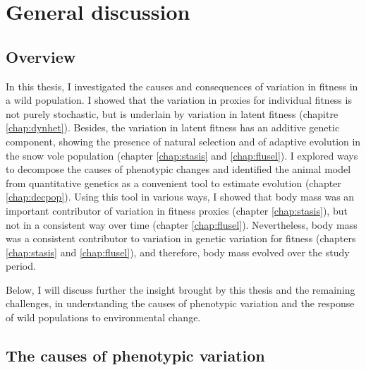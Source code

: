 
\chapter[\texorpdfstring{Chapter 6 \\ General discussion}{Chapter 6 General discussion}]{General discussion}
\label{chap:discu}

\section{Overview}
In this thesis, I investigated the causes and consequences of variation in fitness in a wild population. I showed that the variation in proxies for individual fitness is not purely stochastic, but is underlain by variation in latent fitness (chapitre \ref{chap:dynhet}). Besides, the variation in latent fitness has an additive genetic component, showing the presence of natural selection and of adaptive evolution in the snow vole population (chapter \ref{chap:stasis} and \ref{chap:flusel}).
I explored ways to decompose the causes of phenotypic changes and identified the animal model from quantitative genetics as a convenient tool to estimate evolution (chapter \ref{chap:decpop}).
Using this tool in various ways, I showed that body mass was an important contributor of variation in fitness proxies (chapter \ref{chap:stasis}), but not in a consistent way over time (chapter \ref{chap:flusel}). Nevertheless, body mass was a consistent contributor to variation in genetic variation for fitness (chapters \ref{chap:stasis} and \ref{chap:flusel}), and therefore, body mass evolved over the study period.

Below, I will discuss further the insight brought by this thesis and the remaining challenges, in understanding the causes of phenotypic variation and the response of wild populations to environmental change. 

\section{The causes of phenotypic variation}
